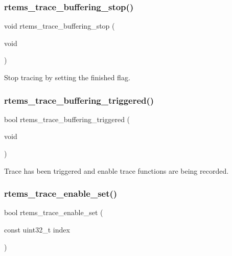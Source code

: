 \subsubsection{\texorpdfstring{rtems\_trace\_buffering\_stop()}{rtems\_trace\_buffering\_stop()}}
{\footnotesize\ttfamily void rtems\+\_\+trace\+\_\+buffering\+\_\+stop (\begin{DoxyParamCaption}\item[{void}]{ }\end{DoxyParamCaption})}

Stop tracing by setting the finished flag. \mbox{\label{rtems-trace-buffer-vars_8h_ad56df301de0d2917e1a6ef7b27c5d4c6}} 
\subsubsection{\texorpdfstring{rtems\_trace\_buffering\_triggered()}{rtems\_trace\_buffering\_triggered()}}
{\footnotesize\ttfamily bool rtems\+\_\+trace\+\_\+buffering\+\_\+triggered (\begin{DoxyParamCaption}\item[{void}]{ }\end{DoxyParamCaption})}

Trace has been triggered and enable trace functions are being recorded. \mbox{\label{rtems-trace-buffer-vars_8h_a65eff2f599c5beeac520a30e4b250df5}} 
\subsubsection{\texorpdfstring{rtems\_trace\_enable\_set()}{rtems\_trace\_enable\_set()}}
{\footnotesize\ttfamily bool rtems\+\_\+trace\+\_\+enable\+\_\+set (\begin{DoxyParamCaption}\item[{const uint32\+\_\+t}]{index }\end{DoxyParamCaption})}

